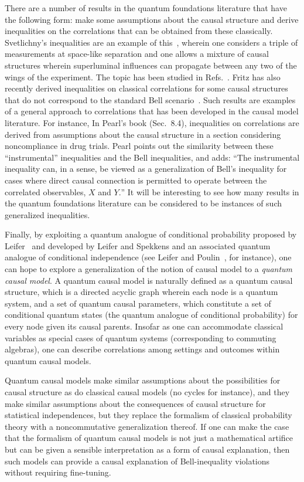 \documentclass[12pt,onecolumn,nofootinbib]{revtex4-2}
\begin{document}
There are a number of results in the quantum foundations literature that
have the following form: make some assumptions about the causal structure
and derive inequalities on the correlations that can be obtained from these classically.
Svetlichny's inequalities are an example of this~\cite{Svetlichny1987}, wherein one considers a
triple of measurements at space-like separation and one allows a mixture of
causal structures wherein superluminal influences can propagate between any
two of the wings of the experiment. The topic has been studied in Refs.~\cite{Mitchell2004, Acin2011,Barrett2011}.  Fritz has also recently derived inequalities on classical correlations for some causal structures that do not correspond to the standard Bell scenario~\cite{Fritz2012}.
Such results are examples of a general approach to correlations that has
been developed in the causal model literature. For instance, In Pearl's book (Sec.~8.4), inequalities on correlations are derived from assumptions about
the causal structure in a section considering noncompliance in drug trials.
Pearl points out the similarity between these ``instrumental'' inequalities and the Bell
inequalities, and adds: ``The instrumental inequality can, in a sense,
be viewed as a generalization of Bell's inequality for cases where direct
causal connection is permitted to operate between the correlated
observables, $X$ and $Y.$'' It will be interesting to see
how many results in the quantum foundations literature can be considered to
be instances of such generalized inequalities.

Finally, by exploiting a quantum analogue of conditional probability
proposed by Leifer~\cite{Leifer2006a} and developed by Leifer and Spekkens \cite{Leifer2011,Leifer2011a} and an
associated quantum analogue of conditional independence (see Leifer and
Poulin~\cite{Leifer2008}, for instance), one can hope to explore a generalization of
the notion of causal model to a \emph{quantum causal model}. A quantum
causal model is naturally defined as a quantum causal structure, which is a
directed acyclic graph wherein each node is a quantum system, and a set of
quantum causal parameters, which constitute a set of conditional quantum
states (the quantum analogue of conditional probability) for every node
given its causal parents. Insofar as one can accommodate classical
variables as special cases of quantum systems (corresponding to commuting
algebras), one can describe correlations among
settings and outcomes within quantum causal models.

Quantum causal models make similar assumptions about the possibilities
for causal structure as do classical causal models (no cycles for instance),
and they make similar assumptions about the consequences of causal structure
for statistical independences, but they replace the formalism of
classical probability theory with a noncommutative generalization thereof.
If one can make the case that the formalism of quantum causal models is not just a mathematical artifice but can be given a sensible interpretation as a form of causal explanation, then such models can provide a causal explanation of Bell-inequality violations without requiring fine-tuning.
\end{document}
